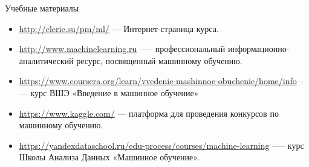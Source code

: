 \documentclass{beamer}
\begin{document}
\begin{frame}{Учебные материалы}
    \begin{itemize}
        \item \url{http://cleric.su/pm/ml/}  --- Интернет-страница курса.
        \item \url{http://www.machinelearning.ru} —-- профессиональный информационно-аналитический ресурс, посвященный машинному обучению.
        \item \url{https://www.coursera.org/learn/vvedenie-mashinnoe-obuchenie/home/info} --— курс ВШЭ «Введение в машинное обучение»
        \item \url{https://www.kaggle.com/} --- платформа для проведения конкурсов по машинному обучению.
        \item \url{https://yandexdataschool.ru/edu-process/courses/machine-learning} --— курс Школы Анализа Данных «Машинное обучение».
    \end{itemize}
\end{frame}
\end{document}
